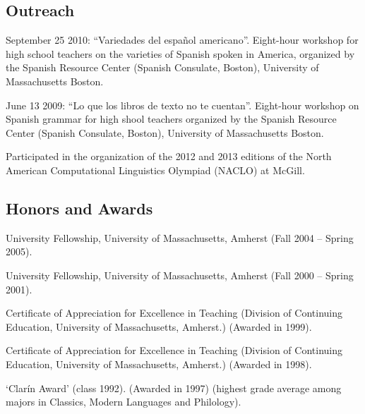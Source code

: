 \documentclass[11pt]{article}
\begin{document}
\subsection*{Outreach}


September 25 2010: ``Variedades del espa\~nol americano''. Eight-hour
workshop for high school teachers on the varieties of Spanish spoken in America, organized by the
Spanish Resource Center (Spanish Consulate, Boston), University of Massachusetts Boston.

June 13 2009: ``Lo que los libros de texto no te cuentan''. Eight-hour
workshop  on Spanish grammar for high shool teachers organized by the
Spanish Resource Center (Spanish Consulate, Boston), University of
Massachusetts Boston.

Participated in the organization of the 2012 and 2013 editions of the North
American Computational Linguistics Olympiad (NACLO) at McGill.


\subsection*{Honors and Awards} 

University Fellowship, University of Massachusetts, Amherst (Fall
 2004 -- Spring 2005).

University Fellowship, University of Massachusetts, Amherst (Fall 2000
-- Spring 2001).

Certificate of Appreciation for Excellence in Teaching (Division of
Continuing Education, University of Massachusetts, Amherst.) (Awarded
in 1999).

Certificate of Appreciation for Excellence in Teaching (Division of
Continuing Education, University of Massachusetts, Amherst.) (Awarded
in 1998).

`Clar\'in Award' (class 1992). (Awarded in 1997) (highest grade average among majors in Classics, Modern Languages and Philology).


\end{document}
